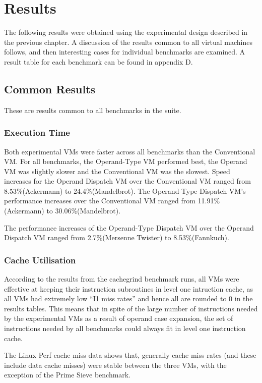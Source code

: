 \documentclass[english,a4paper,12pt]{report}
\begin{document}
\chapter{Results}

The following results were obtained using the experimental design
described in the previous chapter. A discussion of the results common
to all virtual machines follows, and then interesting cases for
individual benchmarks are examined. A result table for each benchmark
can be found in appendix D.

\section{Common Results}

These are results common to all benchmarks in the suite.

\subsection{Execution Time}
Both experimental VMs were faster across all benchmarks than the
Conventional VM. For all benchmarks, the Operand-Type VM performed
best, the Operand VM was slightly slower and the Conventional VM was
the slowest. Speed increases for the Operand Dispatch VM over the
Conventional VM ranged from 8.53\%(Ackermann) to
24.4\%(Mandelbrot). The Operand-Type Dispatch VM's performance
increases over the Conventional VM ranged from 11.91\%(Ackermann) to
30.06\%(Mandelbrot). 

The performance increases of the Operand-Type Dispatch VM over the
Operand Dispatch VM ranged from 2.7\%(Mersenne Twister) to
8.53\%(Fannkuch).

\subsection{Cache Utilisation}
According to the results from the cachegrind benchmark runs, all VMs
were effective at keeping their instruction subroutines in level one
intruction cache, as all VMs had extremely low ``I1 miss rates'' and
hence all are rounded to 0 in the results tables. This means that in
spite of the large number of instructions needed by the experimental
VMs as a result of operand case expansion, the set of instructions
needed by all benchmarks could always fit in level one instruction
cache.

The Linux Perf cache miss data shows that, generally cache miss rates
(and these include data cache misses) were stable between the three
VMs, with the exception of the Prime Sieve benchmark.
\end{document}
